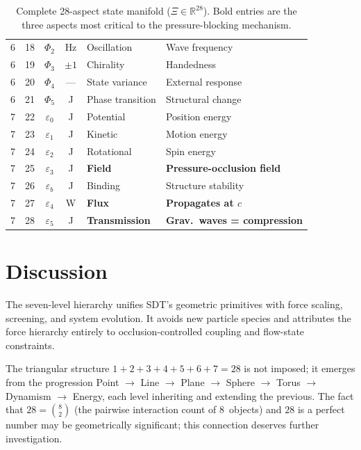 \begin{table}[h]
\begin{tabular}{|c|c|c|c|p{4.0cm}|p{4.0cm}|}
6 & 18 & $\Phi_2$      & Hz         & Oscillation                & Wave frequency \\
6 & 19 & $\Phi_3$      & $\pm 1$    & Chirality                  & Handedness \\
6 & 20 & $\Phi_4$      & ---        & State variance             & External response \\
6 & 21 & $\Phi_5$      & J          & Phase transition           & Structural change \\
\hline
7 & 22 & $\varepsilon_0$ & J        & Potential                  & Position energy \\
7 & 23 & $\varepsilon_1$ & J        & Kinetic                    & Motion energy \\
7 & 24 & $\varepsilon_2$ & J        & Rotational                 & Spin energy \\
7 & 25 & $\varepsilon_3$ & J        & \textbf{Field}             & \textbf{Pressure-occlusion field} \\
7 & 26 & $\varepsilon_b$ & J        & Binding                    & Structure stability \\
7 & 27 & $\varepsilon_4$ & W        & \textbf{Flux}              & \textbf{Propagates at $c$} \\
7 & 28 & $\varepsilon_5$ & J        & \textbf{Transmission}      & \textbf{Grav.\ waves = compression} \\
\hline
\end{tabular}
\caption{Complete 28-aspect state manifold ($\Xi \in \mathbb{R}^{28}$).  Bold entries are the three aspects most critical to the pressure-blocking mechanism.}
\end{table}


\section{Discussion}

The seven-level hierarchy unifies SDT's geometric primitives with force scaling, screening, and system evolution.  It avoids new particle species and attributes the force hierarchy entirely to occlusion-controlled coupling and flow-state constraints.

The triangular structure $1{+}2{+}3{+}4{+}5{+}6{+}7 = 28$ is not imposed; it emerges from the progression Point $\to$ Line $\to$ Plane $\to$ Sphere $\to$ Torus $\to$ Dynamism $\to$ Energy, each level inheriting and extending the previous.  The fact that $28 = \binom{8}{2}$ (the pairwise interaction count of 8~objects) and $28$ is a perfect number may be geometrically significant; this connection deserves further investigation.

